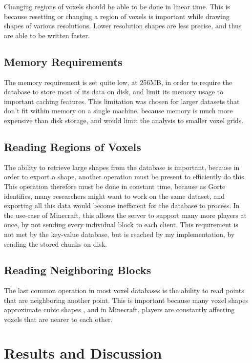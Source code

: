 \documentclass[10pt,twocolumn]{article}
\begin{document}
Changing regions of voxels should be able to be done in linear time. This is
because resetting or changing a region of voxels is important while drawing
shapes of various resolutions. Lower resolution shapes are less precise, and
thus are able to be written faster.

\subsection{Memory Requirements}

The memory requirement is set quite low, at 256MB, in order to require the
database to store most of its data on disk, and limit its memory usage to
important caching features. This limitation was chosen for larger datasets that
don't fit within memory on a single machine, because memory is much more
expensive than disk storage, and would limit the analysis to smaller voxel grids.

\subsection{Reading Regions of Voxels}

The ability to retrieve large shapes from the database is important, because in
order to export a shape, another operation must be present to efficiently do
this. This operation therefore must be done in constant time, because as
Gorte\cite{gorte2023analysis} identifies, many researchers might want to work
on the same dataset, and exporting all this data would become inefficient for
the database to process. In the use-case of Minecraft, this allows the server to
support many more players at once, by not sending every individual block to each
client. This requirement is not met by the key-value database, but is reached by
my implementation, by sending the stored chunks on disk.

\subsection{Reading Neighboring Blocks}

The last common operation in most voxel databases is the ability to read points
that are neighboring another point. This is important because many voxel shapes
approximate cubic shapes \cite{gorte2023analysis}, and in Minecraft, players are
constantly affecting voxels that are nearer to each other.

\section{Results and Discussion}
\end{document}
